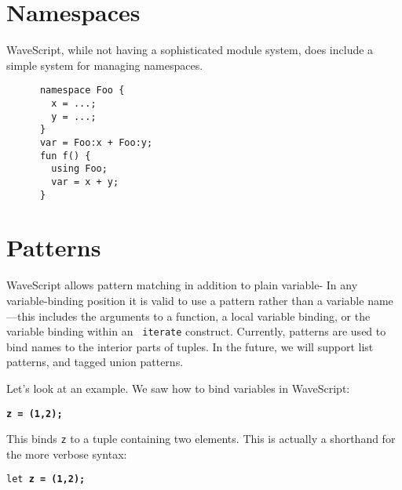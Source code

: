 \documentclass[twocolumn]{report}
\begin{document}





  






\section{Namespaces}

WaveScript, while not having a sophisticated module system, does
include a simple system for managing namespaces.

\begin{center}
\begin{verbatim}
      namespace Foo {
        x = ...;
        y = ...;
      }
      var = Foo:x + Foo:y;
      fun f() {
        using Foo;
        var = x + y;
      }
\end{verbatim}
\end{center}


\section{Patterns}
\label{s:patterns}

WaveScript allows pattern matching in addition to plain variable-
In any variable-binding position it is valid to use a pattern rather
than a variable name---this includes the arguments to a function, a
local variable binding, or the variable binding within an {\tt
 iterate} construct.  Currently, patterns are used to bind names
to the interior parts of tuples.  In the future, we will support list
patterns, and tagged union patterns.  

Let's look at an example.
We saw how to bind variables in WaveScript:
\begin{center}
{\tt \bf{z} = (1,2);}
\end{center}
This binds {\tt z} to a tuple containing two elements.  
This is actually a shorthand for the more verbose syntax:
\begin{center}
{\tt let \bf{z} = (1,2);}
\end{center}
\end{document}
